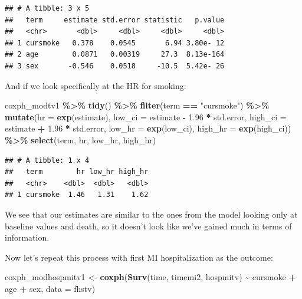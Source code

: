 \documentclass[
]{book}
\newenvironment{Shaded}{\begin{snugshade}}{\end{snugshade}}
\newcommand{\AttributeTok}[1]{\textcolor[rgb]{0.13,0.29,0.53}{#1}}
\newcommand{\FloatTok}[1]{\textcolor[rgb]{0.00,0.00,0.81}{#1}}
\newcommand{\FunctionTok}[1]{\textcolor[rgb]{0.13,0.29,0.53}{\textbf{#1}}}
\newcommand{\NormalTok}[1]{#1}
\newcommand{\OtherTok}[1]{\textcolor[rgb]{0.56,0.35,0.01}{#1}}
\newcommand{\SpecialCharTok}[1]{\textcolor[rgb]{0.81,0.36,0.00}{\textbf{#1}}}
\newcommand{\StringTok}[1]{\textcolor[rgb]{0.31,0.60,0.02}{#1}}
\begin{document}
\begin{verbatim}
## # A tibble: 3 x 5
##   term     estimate std.error statistic   p.value
##   <chr>       <dbl>     <dbl>     <dbl>     <dbl>
## 1 cursmoke   0.378    0.0545       6.94 3.80e- 12
## 2 age        0.0871   0.00319     27.3  8.13e-164
## 3 sex       -0.546    0.0518     -10.5  5.42e- 26
\end{verbatim}

And if we look specifically at the HR for smoking:

\begin{Shaded}
\begin{Highlighting}[]
\NormalTok{coxph\_modtv1 }\SpecialCharTok{\%\textgreater{}\%} 
  \FunctionTok{tidy}\NormalTok{() }\SpecialCharTok{\%\textgreater{}\%} 
  \FunctionTok{filter}\NormalTok{(term }\SpecialCharTok{==} \StringTok{"cursmoke"}\NormalTok{) }\SpecialCharTok{\%\textgreater{}\%} 
  \FunctionTok{mutate}\NormalTok{(}\AttributeTok{hr =} \FunctionTok{exp}\NormalTok{(estimate),}
         \AttributeTok{low\_ci =}\NormalTok{ estimate }\SpecialCharTok{{-}} \FloatTok{1.96} \SpecialCharTok{*}\NormalTok{ std.error, }
         \AttributeTok{high\_ci =}\NormalTok{ estimate }\SpecialCharTok{+} \FloatTok{1.96} \SpecialCharTok{*}\NormalTok{ std.error, }
         \AttributeTok{low\_hr =} \FunctionTok{exp}\NormalTok{(low\_ci), }
         \AttributeTok{high\_hr =} \FunctionTok{exp}\NormalTok{(high\_ci)) }\SpecialCharTok{\%\textgreater{}\%} 
  \FunctionTok{select}\NormalTok{(term, hr, low\_hr, high\_hr)}
\end{Highlighting}
\end{Shaded}

\begin{verbatim}
## # A tibble: 1 x 4
##   term        hr low_hr high_hr
##   <chr>    <dbl>  <dbl>   <dbl>
## 1 cursmoke  1.46   1.31    1.62
\end{verbatim}

We see that our estimates are similar to the ones from the model looking only at baseline values and death, so it doesn't look like we've gained much in terms of information.

Now let's repeat this process with first MI hospitalization as the outcome:

\begin{Shaded}
\begin{Highlighting}[]
\NormalTok{coxph\_modhospmitv1 }\OtherTok{\textless{}{-}} \FunctionTok{coxph}\NormalTok{(}\FunctionTok{Surv}\NormalTok{(time, timemi2, hospmitv) }\SpecialCharTok{\textasciitilde{}} 
\NormalTok{                              cursmoke }\SpecialCharTok{+}\NormalTok{ age }\SpecialCharTok{+}\NormalTok{ sex, }\AttributeTok{data =}\NormalTok{ fhstv)}
\end{Highlighting}
\end{Shaded}
\end{document}
